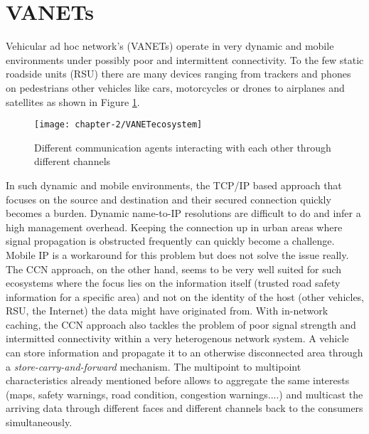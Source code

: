 \newpage
\section{VANETs}

Vehicular ad hoc network's (VANETs) operate in very dynamic and mobile environments under possibly poor and intermittent connectivity. To the few static roadside units (RSU) there are many devices ranging from trackers and phones on pedestrians other vehicles like cars, motorcycles or drones to airplanes and satellites as shown in Figure \ref{fig:VANETecosystem}.

\vspace{5mm} %

\begin{figure}[H]
  \centering
  \texttt{[image: chapter-2/VANETecosystem]}
  \caption{Different communication agents interacting with each other through different channels}
  \label{fig:VANETecosystem}
\end{figure}

\vspace{5mm} %

In such dynamic and mobile environments, the TCP/IP based approach that focuses on the source and destination and their secured connection quickly becomes a burden. Dynamic name-to-IP resolutions are difficult to do and infer a high management overhead. Keeping the connection up in urban areas where signal propagation is obstructed frequently can quickly become a challenge. Mobile IP is a workaround for this problem but does not solve the issue really. The CCN approach, on the other hand, seems to be very well suited for such ecosystems where the focus lies on the information itself (trusted road safety information for a specific area) and not on the identity of the host (other vehicles, RSU, the Internet) the data might have originated from. With in-network caching, the CCN approach also tackles the problem of poor signal strength and intermitted connectivity within a very heterogenous network system. A vehicle can store information and propagate it to an otherwise disconnected area through a \emph{store-carry-and-forward} mechanism. The multipoint to multipoint characteristics already mentioned before allows to aggregate the same interests (maps, safety warnings, road condition, congestion warnings....) and multicast the arriving data through different faces and different channels back to the consumers simultaneously.

\vspace{5mm} %

